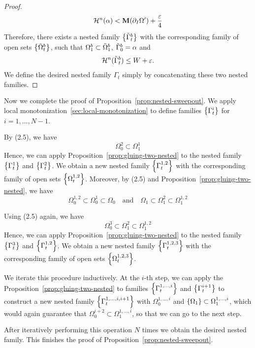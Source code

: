 \begin{proposition}
\begin{proof}
        \begin{equation*}
            \mathcal{H}^n(\alpha) < \mathbf{M}(\partial_I\Omega') + \frac{\varepsilon}{4}
        \end{equation*}
        Therefore, there exists a nested family $\left\{\Tilde{\Gamma}_t^b\right\}$ with the corresponding family of open sets $\left\{\Tilde{\Omega}_t^b\right\}$, such that $\Omega_1^b \subset \Tilde{\Omega}_1^b$, $\Tilde{\Gamma}_0^b = \alpha$ and
        \begin{equation*}
            \mathcal{H}^n(\Tilde{\Gamma}_t^b) \leq W + \varepsilon.
        \end{equation*}
        We define the desired nested family $\Gamma_t$ simply by concatenating these two nested families.
    \end{proof}
\end{proposition}
Now we complete the proof of Proposition~\ref{prop:nested-sweepout}. We apply local monotonization~\ref{sec:local-monotonization} to define families $\left\{\Gamma_t^i\right\}$ for $i = 1, \dots, N - 1$.

By (2.5), we have
\begin{equation*}
    \Omega_0^2 \subset \Omega_1^1
\end{equation*}
Hence, we can apply Proposition~\ref{prop:gluing-two-nested} to the nested family $\left\{\Gamma_t^1\right\}$ and $\left\{\Gamma_t^2\right\}$. We obtain a new nested family $\left\{\Gamma_t^{1, 2}\right\}$ with the corresponding family of open sets $\left\{\Omega_t^{1, 2}\right\}$. Moreover, by (2.5) and Proposition~\ref{prop:gluing-two-nested}, we have
\begin{equation*}
    \Omega_0^{1, 2} \subset \Omega_0^1 \subset \Omega_0 \quad\text{and}\quad\Omega_1 \subset \Omega_1^2 \subset \Omega_1^{1, 2}
\end{equation*}

Using (2.5) again, we have
\begin{equation*}
    \Omega_0^3 \subset \Omega_1^2 \subset \Omega_1^{1, 2}
\end{equation*}
Hence, we can apply Proposition~\ref{prop:gluing-two-nested} to the nested family $\left\{\Gamma_t^3\right\}$ and $\left\{\Gamma_t^{1, 2}\right\}$. We obtain a new nested family $\left\{\Gamma_t^{1, 2, 3}\right\}$ with the corresponding family of open sets $\left\{\Omega_t^{1, 2, 3}\right\}$.

We iterate this procedure inductively. At the $i$-th step, we can apply the Proposition~\ref{prop:gluing-two-nested} to families $\left\{\Gamma_t^{1, \dots, i}\right\}$ and $\left\{\Gamma_t^{i+1}\right\}$ to construct a new nested family $\left\{\Gamma_t^{1, \dots, i, i + 1}\right\}$ with $\Omega_0^{1, \dots, i}$ and $\left\{\Omega_1\right\} \subset \Omega_1^{1, \dots, i}$, which would again guarantee that $\Omega_0^{i + 2} \subset \Omega_1^{1, \dots, i}$, so that we can go to the next step.

After iteratively performing this operation $N$ times we obtain the desired nested family. This finishes the proof of Proposition~\ref{prop:nested-sweepout}.
